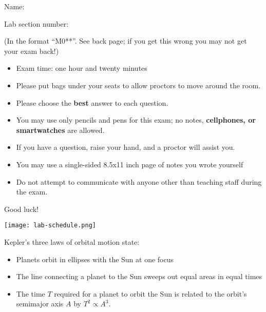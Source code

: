 \documentclass[12pt]{article}
\newcommand{\BC}{\begin{center}}
\newcommand{\EC}{\end{center}}
\newcommand{\BI}{\begin{itemize}}
\newcommand{\EI}{\end{itemize}}
\begin{document}
\Large \centerline{}
\vspace{1in}

\Large
\hspace{1in} Name: \underline{\hspace{3in}}

\bigskip



\hspace{1in} Lab section number: \underline{\hspace{1.7in}}

\centerline{\small(In the format ``M0**''. See back page; if you get this wrong you may not get your exam back!)}

\normalsize

\vspace{1.4in}

\begin{itemize}
  \item{Exam time: one hour and twenty minutes}
  \item{Please put bags under your seats to allow proctors to move around the room.}
  \item{Please choose the {\bf best} answer to each question.}
  \item{You may use only pencils and pens for this exam; no notes, {\bf cellphones, or smartwatches} are allowed.}
  \item{If you have a question, raise your hand, and a proctor will assist you.}
  \item{You may use a single-sided 8.5x11 inch page of notes you wrote yourself}
  \item{Do not attempt to communicate with anyone other than teaching staff during the exam.}
\end{itemize}

\BC Good luck! \EC
\newpage

\Large \centerline{}
\BC
\texttt{[image: lab-schedule.png]}
\EC
\newpage
\Large \centerline{}
\normalsize

\begin{center}
Kepler's three laws of orbital motion state:
\end{center}

\BI
\item Planets orbit in ellipses with the Sun at one focus
\item The line connecting a planet to the Sun sweeps out equal areas in equal times
\item The time $T$ required for a planet to orbit the Sun is related to the orbit's semimajor axis $A$ by $T^2 \propto A^3$.
\EI
\end{document}
